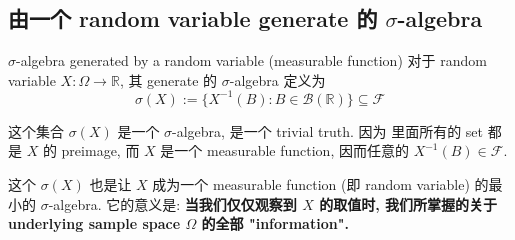 



\subsection{由一个 random variable generate 的 $\sigma$-algebra}
\begin{definition}{$\sigma$-algebra generated by a random variable (measurable function)}
    对于 random variable \(X: \Omega \to \mathbb{R}\), 
    其 generate 的 \(\sigma\)-algebra 定义为
    \[
    \sigma(X) := \{X^{-1}(B) : B \in \mathcal{B}(\mathbb{R})\} \subseteq \mathcal{F}
    \]
    
\end{definition}
这个集合 \(\sigma(X)\) 是一个 \(\sigma\)-algebra, 是一个 trivial truth. 因为
里面所有的 set 都是 \(X\) 的 preimage, 而 \(X\) 是一个 measurable function, 
因而任意的 \(X^{-1}(B) \in \mathcal{F}\).

这个 \(\sigma(X)\) 也是让 \(X\) 成为一个 measurable function (即 random variable) 
的最小的 \(\sigma\)-algebra. 它的意义是: 
\textbf{当我们仅仅观察到 $X$ 的取值时, 我们所掌握的关于 
underlying sample space $\Omega$ 的全部 "information".} 

